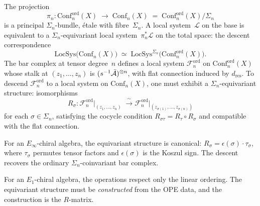 \begin{construction}
The projection
\[
\pi_n\colon
\mathrm{Conf}_n^{\mathrm{ord}}(X)
\;\longrightarrow\;
\mathrm{Conf}_n(X)
\;=\;
\mathrm{Conf}_n^{\mathrm{ord}}(X)/\Sigma_n
\]
is a principal $\Sigma_n$-bundle, \'etale with fibre~$\Sigma_n$.
A local system~$\mathcal{L}$ on the base is equivalent to a
$\Sigma_n$-equivariant local system~$\pi_n^*\mathcal{L}$ on the total
space: the descent correspondence
\[
\mathrm{LocSys}\bigl(\mathrm{Conf}_n(X)\bigr)
\;\simeq\;
\mathrm{LocSys}^{\Sigma_n}
\bigl(\mathrm{Conf}_n^{\mathrm{ord}}(X)\bigr).
\]
The bar complex at tensor degree~$n$ defines a local system
$\mathcal{F}_n^{\mathrm{ord}}$ on $\mathrm{Conf}_n^{\mathrm{ord}}(X)$
whose stalk at $(z_1,\dots,z_n)$ is
$(s^{-1}\bar{\mathcal{A}})^{\otimes n}$, with flat connection induced by
$d_{\mathrm{res}}$. To descend $\mathcal{F}_n^{\mathrm{ord}}$ to a
local system on $\mathrm{Conf}_n(X)$, one must exhibit a
$\Sigma_n$-equivariant structure: isomorphisms
\[
R_\sigma\colon
\mathcal{F}_n^{\mathrm{ord}}\big|_{(z_1,\dots,z_n)}
\;\xrightarrow{\;\sim\;}
\mathcal{F}_n^{\mathrm{ord}}\big|_{(z_{\sigma(1)},\dots,z_{\sigma(n)})}
\]
for each $\sigma\in\Sigma_n$, satisfying the cocycle condition
$R_{\sigma\tau}=R_\tau\circ R_\sigma$ and compatible with the
flat connection.

For an $E_\infty$-chiral algebra, the equivariant structure
is canonical: $R_\sigma=\epsilon(\sigma)\cdot\tau_\sigma$, where
$\tau_\sigma$ permutes tensor factors and $\epsilon(\sigma)$ is
the Koszul sign. The descent recovers the ordinary
$\Sigma_n$-coinvariant bar complex.

For an $E_1$-chiral algebra, the operations respect only
the linear ordering. The equivariant structure must be
\emph{constructed} from the OPE data, and the construction
is the $R$-matrix.
\end{construction}

